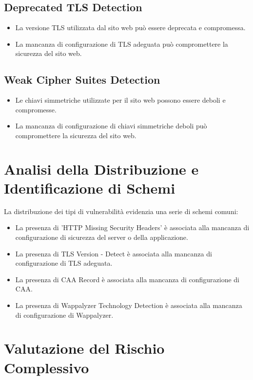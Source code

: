 \subsection{Deprecated TLS Detection}
\begin{itemize}
\item La versione TLS utilizzata dal sito web può essere deprecata e compromessa.
\item La mancanza di configurazione di TLS adeguata può compromettere la sicurezza del sito web.
\end{itemize}
\subsection{Weak Cipher Suites Detection}
\begin{itemize}
\item Le chiavi simmetriche utilizzate per il sito web possono essere deboli e compromesse.
\item La mancanza di configurazione di chiavi simmetriche deboli può compromettere la sicurezza del sito web.
\end{itemize}
\section{Analisi della Distribuzione e Identificazione di Schemi}

La distribuzione dei tipi di vulnerabilità evidenzia una serie di schemi comuni:
\begin{itemize}
\item La presenza di 'HTTP Missing Security Headers' è associata alla mancanza di configurazione di sicurezza del server o della applicazione.
\item La presenza di TLS Version - Detect è associata alla mancanza di configurazione di TLS adeguata.
\item La presenza di CAA Record è associata alla mancanza di configurazione di CAA.
\item La presenza di Wappalyzer Technology Detection è associata alla mancanza di configurazione di Wappalyzer.
\end{itemize}
\section{Valutazione del Rischio Complessivo}

